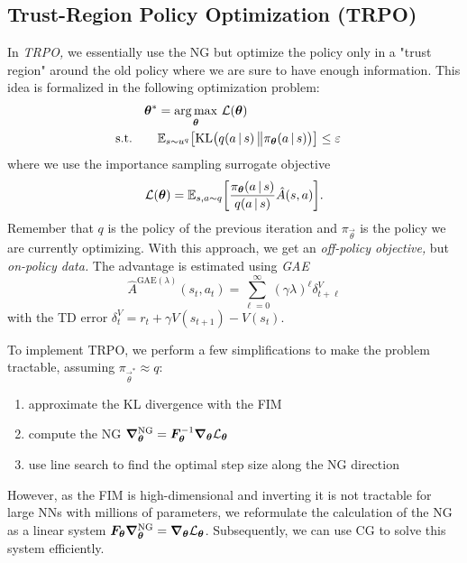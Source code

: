 		\subsection{Trust-Region Policy Optimization (\acs{TRPO})}
			In \emph{\ac{TRPO},} we essentially use the \ac{NG} but optimize the policy only in a "trust region" around the old policy where we are sure to have enough information. This idea is formalized in the following optimization problem:
			\begin{equation}
				\begin{aligned}
					\bm{\theta}^\ast &= \operatorname*{arg\,max}_{\bm{\theta}} \, \mathcal{L}(\bm{\theta}) \\
					\text{s.t.}\qquad&
						\begin{aligned}
							\mathbb{E}_{s \sim u^q}\bigl[ \operatorname{KL}\bigl( q(a \,\vert\, s) \,\big\Vert \pi_{\bm{\theta}}(a \,\vert\, s) \bigr) \bigr] &\leq \varepsilon
						\end{aligned}
				\end{aligned}
			\end{equation}
			where we use the importance sampling surrogate objective
			\begin{equation}
				\mathcal{L}(\bm{\theta}) = \mathbb{E}_{s, a \sim q}\biggl[ \frac{\pi_{\bm{\theta}}(a \,\vert\, s)}{q(a \,\vert\, s)} \hat{A}(s, a) \biggr].
			\end{equation}
			Remember that \(q\) is the policy of the previous iteration and \(\pi_{\vec{\theta}}\) is the policy we are currently optimizing. With this approach, we get an \emph{off-policy objective,} but \emph{on-policy data.} The advantage is estimated using \emph{\ac{GAE}}
			\begin{equation}
				\hat{A}^{\mathrm{GAE}(\lambda)}(s_t, a_t) = \sum_{\ell = 0}^{\infty} (\gamma \lambda)^\ell \delta_{t + \ell}^V
			\end{equation}
			with the \ac{TD} error \( \delta_t^V = r_t + \gamma V(s_{t + 1}) - V(s_t) \).

			To implement \ac{TRPO}, we perform a few simplifications to make the problem tractable, assuming \( \pi_{\vec{\theta}^\ast} \approx q \):
			\begin{enumerate}
				\item approximate the \ac{KL} divergence with the \ac{FIM}
				\item compute the \ac{NG} \( \grad_{\bm{\theta}}^\mathrm{NG} = \bm{F}_{\bm{\theta}}^{-1} \grad_{\bm{\theta}} \mathcal{L}_{\bm{\theta}} \)
				\item use line search to find the optimal step size along the \ac{NG} direction
			\end{enumerate}
			However, as the \ac{FIM} is high-dimensional and inverting it is not tractable for large \acp{NN} with millions of parameters, we reformulate the calculation of the \ac{NG} as a linear system \( \bm{F}_{\bm{\theta}} \grad_{\bm{\theta}}^\mathrm{NG} = \grad_{\bm{\theta}} \mathcal{L}_{\bm{\theta}} \). Subsequently, we can use \ac{CG} to solve this system efficiently.

